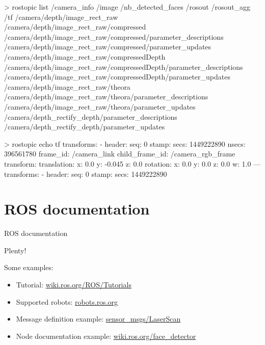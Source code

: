 \documentclass[compress]{beamer}
\begin{document}
\begin{frame}[fragile]{}
\begin{shcode}
> rostopic list
/camera_info
/image
/nb_detected_faces
/rosout
/rosout_agg
/tf
/camera/depth/image_rect_raw
/camera/depth/image_rect_raw/compressed
/camera/depth/image_rect_raw/compressed/parameter_descriptions
/camera/depth/image_rect_raw/compressed/parameter_updates
/camera/depth/image_rect_raw/compressedDepth
/camera/depth/image_rect_raw/compressedDepth/parameter_descriptions
/camera/depth/image_rect_raw/compressedDepth/parameter_updates
/camera/depth/image_rect_raw/theora
/camera/depth/image_rect_raw/theora/parameter_descriptions
/camera/depth/image_rect_raw/theora/parameter_updates
/camera/depth_rectify_depth/parameter_descriptions
/camera/depth_rectify_depth/parameter_updates
\end{shcode}

\end{frame}

\begin{frame}[fragile]{}
\begin{shcode}
> rostopic echo tf
transforms: 
  - 
    header: 
      seq: 0
      stamp: 
        secs: 1449222890
        nsecs: 396561780
      frame_id: /camera_link
    child_frame_id: /camera_rgb_frame
    transform: 
      translation: 
        x: 0.0
        y: -0.045
        z: 0.0
      rotation: 
        x: 0.0
        y: 0.0
        z: 0.0
        w: 1.0
---
transforms: 
  - 
    header: 
      seq: 0
      stamp: 
        secs: 1449222890

\end{shcode}

\end{frame}


\section[Doc]{ROS documentation}

\begin{frame}{ROS documentation}

Plenty!

Some examples:

\begin{itemize}
    \item Tutorial: \href{http://wiki.ros.org/ROS/Tutorials}{wiki.ros.org/ROS/Tutorials}
    \item Supported robots: \href{http://robots.ros.org/}{robots.ros.org}
    \item Message definition example:
        \href{http://docs.ros.org/api/sensor_msgs/html/msg/LaserScan.html}{sensor\_msgs/LaserScan}
    \item Node documentation example:
        \href{http://wiki.ros.org/face_detector}{wiki.ros.org/face\_detector}
\end{itemize}
\end{frame}
\end{document}
